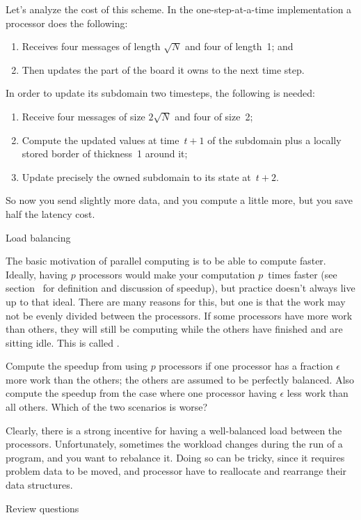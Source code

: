 Let's analyze the cost of this scheme.
In the one-step-at-a-time implementation a processor does the following:
\begin{enumerate}
\item Receives four messages of length $\sqrt N$ and four of length~1; and
\item Then updates the part of the board it owns to the next time step.
\end{enumerate}
In order to update its subdomain two timesteps, the following is needed:
\begin{enumerate}
\item Receive four messages of size $2\sqrt N$ and four of size~2;
\item Compute the updated values at time~$t+1$ of the subdomain plus
  a locally stored border of thickness~1 around it;
\item Update precisely the owned subdomain to its state at~$t+2$.
\end{enumerate}
So now you send slightly more data, and you compute a little more,
but you save half the latency cost.

 {Load balancing}

The basic motivation of parallel computing is to be able to compute
faster.  Ideally, having $p$ processors would make your computation
$p$~times faster (see section~ for
definition and discussion of speedup), but practice doesn't always
live up to that ideal. There are many reasons for this, but one is
that the work may not be evenly divided between the processors.  If
some processors have more work than others, they will still be
computing while the others have finished and are sitting idle. This is
called .

\begin{exercise}
  Compute the speedup from using $p$ processors if one processor has a
  fraction $\epsilon$ more work than the others; the others are
  assumed to be perfectly balanced. Also compute the speedup from the
  case where one processor having $\epsilon$ less work than all
  others. Which of the two scenarios is worse?
\end{exercise}

Clearly, there is a strong incentive for having a well-balanced
load between the processors. Unfortunately, sometimes the workload
changes during the run of a program, and you want to rebalance it.
Doing so can be tricky, since it requires problem data to be moved,
and processor have to reallocate and rearrange their data structures.

\begin{review}
   {Review questions}
  
\end{review}
